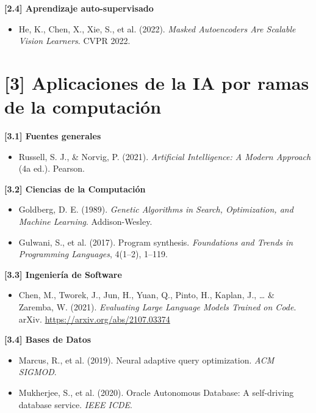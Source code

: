 \documentclass[12pt,a4paper]{report}
\numberwithin{figure}{section}
\begin{document}
\textbf{[2.4] Aprendizaje auto-supervisado}
\label{ref:2.4}
\begin{itemize}
  \item He, K., Chen, X., Xie, S., et al. (2022). \textit{Masked Autoencoders Are Scalable Vision Learners}. CVPR 2022.
\end{itemize}

\section*{[3] Aplicaciones de la IA por ramas de la computación}
\label{ref:3}

\textbf{[3.1] Fuentes generales}
\label{ref:3.1}
\begin{itemize}
  \item Russell, S. J., \& Norvig, P. (2021). \textit{Artificial Intelligence: A Modern Approach} (4a ed.). Pearson.
\end{itemize}

\textbf{[3.2] Ciencias de la Computación}
\label{ref:3.2}
\begin{itemize}
  \item Goldberg, D. E. (1989). \textit{Genetic Algorithms in Search, Optimization, and Machine Learning}. Addison-Wesley.
  \item Gulwani, S., et al. (2017). Program synthesis. \textit{Foundations and Trends in Programming Languages}, 4(1–2), 1–119.
\end{itemize}

\textbf{[3.3] Ingeniería de Software}
\label{ref:3.3}
\begin{itemize}
  \item Chen, M., Tworek, J., Jun, H., Yuan, Q., Pinto, H., Kaplan, J., \ldots{} \& Zaremba, W. (2021). \textit{Evaluating Large Language Models Trained on Code}. arXiv. \url{https://arxiv.org/abs/2107.03374}
\end{itemize}

\textbf{[3.4] Bases de Datos}
\label{ref:3.4}
\begin{itemize}
  \item Marcus, R., et al. (2019). Neural adaptive query optimization. \textit{ACM SIGMOD}.
  \item Mukherjee, S., et al. (2020). Oracle Autonomous Database: A self-driving database service. \textit{IEEE ICDE}.
\end{itemize}
\end{document}
